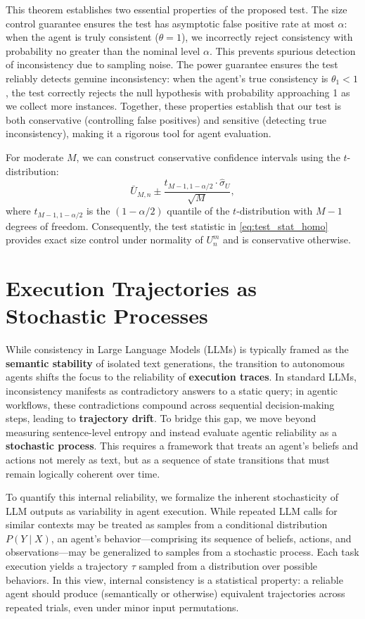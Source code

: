 \documentclass{article}
\theoremstyle{plain}
\theoremstyle{definition}
\theoremstyle{remark}
\begin{document}
This theorem establishes two essential properties of the proposed test. The size control guarantee ensures the test has asymptotic false positive rate at most $\alpha$: when the agent is truly consistent ($\theta = 1$), we incorrectly reject consistency with probability no greater than the nominal level $\alpha$. This prevents spurious detection of inconsistency due to sampling noise. The power guarantee ensures the test reliably detects genuine inconsistency: when the agent's true consistency is $\theta_1 < 1$, the test correctly rejects the null hypothesis with probability approaching 1 as we collect more instances. Together, these properties establish that our test is both conservative (controlling false positives) and sensitive (detecting true inconsistency), making it a rigorous tool for agent evaluation.


For moderate $M$, we can construct conservative confidence intervals using the $t$-distribution:
\begin{equation*}
    \bar{U}_{M,n} \pm \frac{t_{M-1, 1-\alpha/2} \cdot \hat{\sigma}_U}{\sqrt{M}},
\end{equation*}
where $t_{M-1, 1-\alpha/2}$ is the $(1-\alpha/2)$ quantile of the $t$-distribution with $M-1$ degrees of freedom. Consequently, the test statistic in \eqref{eq:test_stat_homo} provides exact size control under normality of $U_n^m$ and is conservative otherwise.

\section{Execution Trajectories as Stochastic Processes}

While consistency in Large Language Models (LLMs) is typically framed as the \textbf{semantic stability} of isolated text generations, the transition to autonomous agents shifts the focus to the reliability of \textbf{execution traces}. In standard LLMs, inconsistency manifests as contradictory answers to a static query; in agentic workflows, these contradictions compound across sequential decision-making steps, leading to \textbf{trajectory drift}. To bridge this gap, we move beyond measuring sentence-level entropy and instead evaluate agentic reliability as a \textbf{stochastic process}. This requires a framework that treats an agent's beliefs and actions not merely as text, but as a sequence of state transitions that must remain logically coherent over time.

To quantify this internal reliability, we formalize the inherent stochasticity of LLM outputs as variability in agent execution. While repeated LLM calls for similar contexts may be treated as samples from a conditional distribution $P(Y \mid X)$, an agent's behavior—comprising its sequence of beliefs, actions, and observations—may be generalized to samples from a stochastic process. Each task execution yields a trajectory $\tau$ sampled from a distribution over possible behaviors. In this view, internal consistency is a statistical property: a reliable agent should produce (semantically or otherwise) equivalent trajectories across repeated trials, even under minor input permutations.
\end{document}
